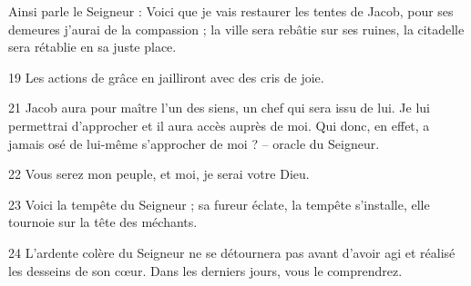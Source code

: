 Ainsi parle le Seigneur : Voici que je vais restaurer les tentes de Jacob, pour ses demeures j’aurai de la compassion ; la ville sera rebâtie sur ses ruines, la citadelle sera rétablie en sa juste place.

19 Les actions de grâce en jailliront avec des cris de joie. 

21 Jacob aura pour maître l’un des siens, un chef qui sera issu de lui. Je lui permettrai d’approcher et il aura accès auprès de moi. Qui donc, en effet, a jamais osé de lui-même s’approcher de moi ? – oracle du Seigneur.

22 Vous serez mon peuple, et moi, je serai votre Dieu.

23 Voici la tempête du Seigneur ; sa fureur éclate, la tempête s’installe, elle tournoie sur la tête des méchants.

24 L’ardente colère du Seigneur ne se détournera pas avant d’avoir agi et réalisé les desseins de son cœur. Dans les derniers jours, vous le comprendrez.